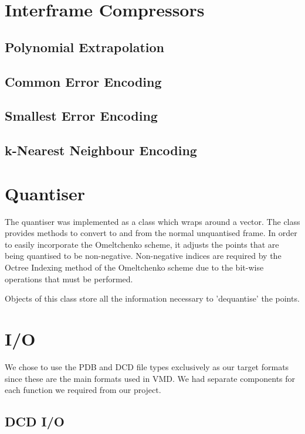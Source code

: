 \documentclass[a4paper,11pt]{report}
\begin{document}
\section{Interframe Compressors}

\subsection{Polynomial Extrapolation}

\subsection{Common Error Encoding}

\subsection{Smallest Error Encoding}

\subsection{k-Nearest Neighbour Encoding}



\section{Quantiser}

The quantiser was implemented as a class which wraps around a vector. The class provides methods to convert to and from the normal unquantised frame. In order to easily incorporate the Omeltchenko scheme, it adjusts the points that are being quantised to be non-negative. Non-negative indices are required by the Octree Indexing method of the Omeltchenko scheme due to the bit-wise operations that must be performed.

Objects of this class store all the information necessary to 'dequantise' the points.

\section{I/O}

We chose to use the PDB and DCD file types exclusively as our target formats since these are the main formats used in VMD. We had separate components for each function we required from our project. 

\subsection{DCD I/O}
\end{document}
